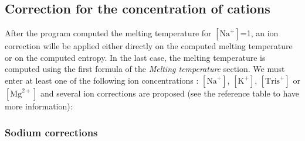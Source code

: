 \documentclass{article}
\begin{document}
\clearpage
\subsection{Correction for the concentration of cations}  

After the program computed the melting temperature for $[\mbox{Na}^+]$=1, an ion correction wille be applied
either directly on the computed melting temperature or on the computed entropy. In the last case, the melting
temperature is computed using the first formula of the \textit{Melting temperature} section.
We must enter at least one of the following ion concentrations : $[\mbox{Na}^+]$, $[\mbox{K}^+]$, $[\mbox{Tris}^+]$ or
$[\mbox{Mg}^{2+}]$ and several ion corrections are proposed  (see the reference table to have more information):

\subsubsection{Sodium corrections}
\end{document}
